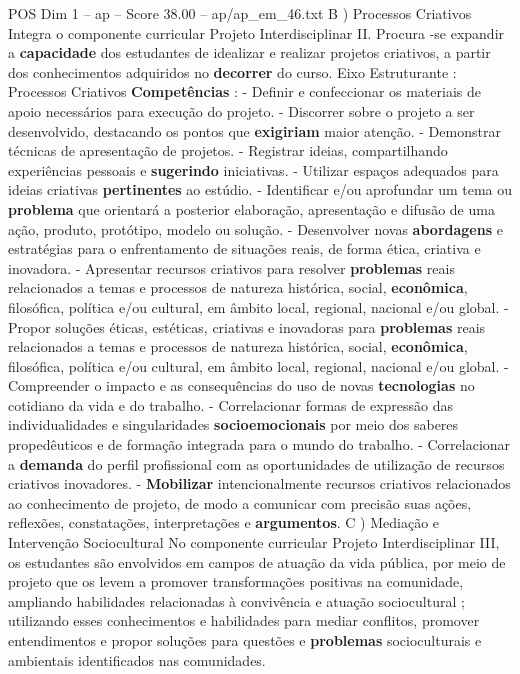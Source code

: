 \begin{textsample}{POS Dim 1 – ap – Score 38.00 – ap/ap\_em\_46.txt}
B ) Processos Criativos Integra o componente curricular Projeto Interdisciplinar II.
Procura -se expandir a \textbf{capacidade} dos estudantes de idealizar e realizar projetos criativos, a partir dos conhecimentos adquiridos no \textbf{decorrer} do curso.
Eixo Estruturante : Processos Criativos \textbf{Competências} : - Definir e confeccionar os materiais de apoio necessários para execução do projeto. - Discorrer sobre o projeto a ser desenvolvido, destacando os pontos que \textbf{exigiriam} maior atenção. - Demonstrar técnicas de apresentação de projetos. - Registrar ideias, compartilhando experiências pessoais e \textbf{sugerindo} iniciativas. - Utilizar espaços adequados para ideias criativas \textbf{pertinentes} ao estúdio. - Identificar e/ou aprofundar um tema ou \textbf{problema} que orientará a posterior elaboração, apresentação e difusão de uma ação, produto, protótipo, modelo ou solução. - Desenvolver novas \textbf{abordagens} e estratégias para o enfrentamento de situações reais, de forma ética, criativa e inovadora. - Apresentar recursos criativos para resolver \textbf{problemas} reais relacionados a temas e processos de natureza histórica, social, \textbf{econômica}, filosófica, política e/ou cultural, em âmbito local, regional, nacional e/ou global. - Propor soluções éticas, estéticas, criativas e inovadoras para \textbf{problemas} reais relacionados a temas e processos de natureza histórica, social, \textbf{econômica}, filosófica, política e/ou cultural, em âmbito local, regional, nacional e/ou global. - Compreender o impacto e as consequências do uso de novas \textbf{tecnologias} no cotidiano da vida e do trabalho. - Correlacionar formas de expressão das individualidades e singularidades \textbf{socioemocionais} por meio dos saberes propedêuticos e de formação integrada para o mundo do trabalho. - Correlacionar a \textbf{demanda} do perfil profissional com as oportunidades de utilização de recursos criativos inovadores. - \textbf{Mobilizar} intencionalmente recursos criativos relacionados ao conhecimento de projeto, de modo a comunicar com precisão suas ações, reflexões, constatações, interpretações e \textbf{argumentos}.
C ) Mediação e Intervenção Sociocultural No componente curricular Projeto Interdisciplinar III, os estudantes são envolvidos em campos de atuação da vida pública, por meio de projeto que os levem a promover transformações positivas na comunidade, ampliando habilidades relacionadas à convivência e atuação sociocultural ; utilizando esses conhecimentos e habilidades para mediar conflitos, promover entendimentos e propor soluções para questões e \textbf{problemas} socioculturais e ambientais identificados nas comunidades.

\end{textsample}
